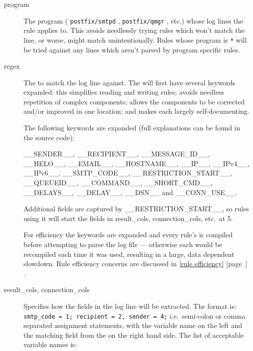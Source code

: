 \documentclass[a4paper,12pt,draft]{article}
\newcommand{\refwithpage}[1]{%
    \empty{}\ref{#1} [page~\pageref{#1}]%
}
\newcommand{\sectionref}[1]{%
    \textsection{}\refwithpage{#1}%
}
\newcommand{\daemon}[1]{%
    \texttt{postfix/#1}%
}
\begin{document}
\begin{description}
    \item [program] The program (\daemon{smtpd}, \daemon{qmgr}, etc.) whose
        log lines the rule applies to.  This avoids needlessly trying rules
        which won't match the line, or worse, might match unintentionally.
        Rules whose program is \texttt{*} will be tried against any lines
        which aren't parsed by program specific rules.

    \item [regex] The \regex{} to match the log line against.  The \regex{}
        will first have several keywords expanded: this simplifies reading
        and writing rules; avoids needless repetition of complex \regex{}
        components; allows the components to be corrected and/or improved
        in one location; and makes each \regex{} largely self-documenting.

        The following keywords are expanded (full explanations can be found
        in the source code):

        \_\_SENDER\_\_, \_\_RECIPIENT\_\_, \_\_MESSAGE\_ID\_\_,
        \_\_HELO\_\_, \newline \_\_EMAIL\_\_, \_\_HOSTNAME\_\_, \_\_IP\_\_,
        \_\_IPv4\_\_, \_\_IPv6\_\_, \newline \_\_SMTP\_CODE\_\_,
        \_\_RESTRICTION\_START\_\_, \_\_QUEUEID\_\_, \newline
        \_\_COMMAND\_\_, \_\_SHORT\_CMD\_\_, \_\_DELAYS\_\_, \_\_DELAY\_\_,
        \_\_DSN\_\_ and \_\_CONN\_USE\_\_.

        Additional fields are captured by \_\_RESTRICTION\_START\_\_, so
        rules using it will start the fields in result\_cols,
        connection\_cols, etc.\ at 5.

        For efficiency the keywords are expanded and every rule's \regex{}
        is compiled before attempting to parse the log file --- otherwise
        each \regex{} would be recompiled each time it was used, resulting
        in a large, data dependent slowdown.  Rule efficiency concerns are
        discussed in \sectionref{rule efficiency}.

    \item [result\_cols, connection\_cols] Specifies how the fields in the
        log line will be extracted.  The format is: \newline
        \texttt{smtp\_code = 1; recipient = 2, sender = 4;} \newline i.e.\
        semi-colon or comma separated assignment statements, with the
        variable name on the left and the matching field from the \regex{}
        on the right hand side.  The list of acceptable variable names is:


\end{description}
\end{document}
